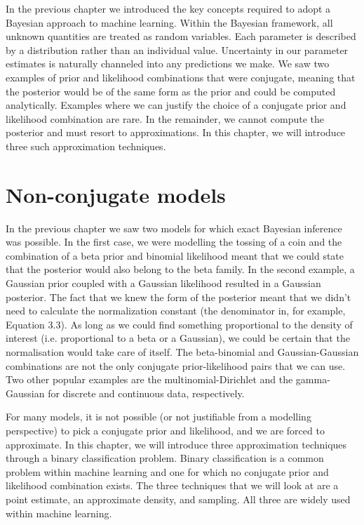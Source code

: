 In the previous chapter we introduced the key concepts required to adopt a Bayesian
approach to machine learning.
Within the Bayesian framework, all unknown quantities are treated as random variables.
Each parameter is described by a distribution
rather than an individual value. Uncertainty in our parameter estimates is naturally
channeled into any predictions we make.
We saw two examples of prior and likelihood combinations that were conjugate,
meaning that the posterior would be of the
same form as the prior and could be computed analytically. Examples where we can
justify the choice of a conjugate prior and likelihood combination are rare. In the
remainder, we cannot compute the posterior and must resort to approximations.
In this chapter, we will introduce three such approximation techniques.


\section{Non-conjugate models}

In the previous chapter we saw two models for which exact Bayesian inference was
possible. In the first case, we were modelling the tossing of a coin and the combination
of a beta prior and binomial likelihood meant that we could state that the posterior
would also belong to the beta family. In the second example, a Gaussian prior coupled
with a Gaussian likelihood resulted in a Gaussian posterior. The fact that we knew
the form of the posterior meant that we didn't need to calculate the normalization
constant (the denominator in, for example, Equation 3.3). As long as we could find
something proportional to the density of interest (i.e. proportional to a beta or a
Gaussian), we could be certain that the normalisation would take care of itself. The
beta-binomial and Gaussian-Gaussian combinations are not the only conjugate
prior-likelihood pairs that we can use. Two other popular examples are the
multinomial-Dirichlet and the gamma-Gaussian for discrete and continuous data, respectively.

For many models, it is not possible (or not justifiable from a modelling
perspective) to pick a conjugate prior and likelihood, and we are forced to approximate.
In this chapter, we will introduce three approximation techniques through a binary
classification problem. Binary classification is a common problem within machine
learning and one for which no conjugate prior and likelihood combination exists.
The three techniques that we will look at are a point estimate, an approximate
density, and sampling. All three are widely used within machine learning.


